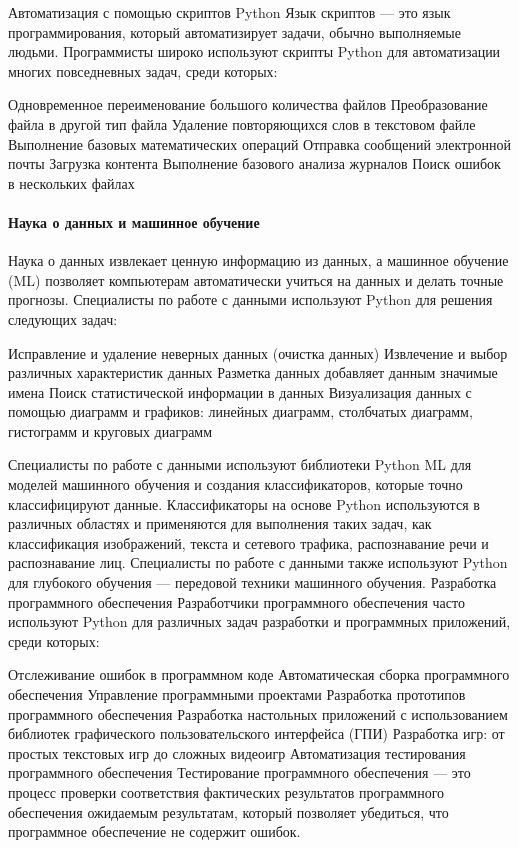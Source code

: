 Автоматизация с помощью скриптов Python
Язык скриптов — это язык программирования, который автоматизирует задачи, обычно выполняемые людьми. Программисты широко используют скрипты Python для автоматизации многих повседневных задач, среди которых:

Одновременное переименование большого количества файлов
Преобразование файла в другой тип файла
Удаление повторяющихся слов в текстовом файле
Выполнение базовых математических операций
Отправка сообщений электронной почты
Загрузка контента
Выполнение базового анализа журналов
Поиск ошибок в нескольких файлах
\paragraph{Наука о данных и машинное обучение}
Наука о данных извлекает ценную информацию из данных, а машинное обучение (ML) позволяет компьютерам автоматически учиться на данных и делать точные прогнозы. Специалисты по работе с данными используют Python для решения следующих задач:

Исправление и удаление неверных данных (очистка данных) 
Извлечение и выбор различных характеристик данных
Разметка данных добавляет данным значимые имена
Поиск статистической информации в данных
Визуализация данных с помощью диаграмм и графиков: линейных диаграмм, столбчатых диаграмм, гистограмм и круговых диаграмм

Специалисты по работе с данными используют библиотеки Python ML для моделей машинного обучения и создания классификаторов, которые точно классифицируют данные. Классификаторы на основе Python используются в различных областях и применяются для выполнения таких задач, как классификация изображений, текста и сетевого трафика, распознавание речи и распознавание лиц. Специалисты по работе с данными также используют Python для глубокого обучения — передовой техники машинного обучения.
Разработка программного обеспечения
Разработчики программного обеспечения часто используют Python для различных задач разработки и программных приложений, среди которых:

Отслеживание ошибок в программном коде
Автоматическая сборка программного обеспечения
Управление программными проектами
Разработка прототипов программного обеспечения
Разработка настольных приложений с использованием библиотек графического пользовательского интерфейса (ГПИ)
Разработка игр: от простых текстовых игр до сложных видеоигр
Автоматизация тестирования программного обеспечения
Тестирование программного обеспечения — это процесс проверки соответствия фактических результатов программного обеспечения ожидаемым результатам, который позволяет убедиться, что программное обеспечение не содержит ошибок. 

